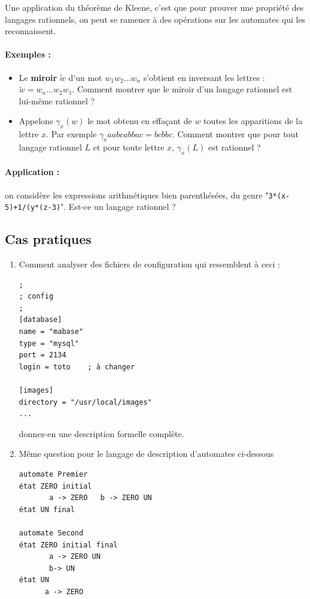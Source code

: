 \documentclass[10pt,twoside]{article}
\begin{document}
 Une application du théorème de Kleene, c'est que pour prouver
 une propriété des langages rationnels, on peut se ramener
 à des opérations sur les automates qui les reconnaissent.
 
\paragraph{ Exemples :}
 \begin{itemize}
 \item Le \textbf{miroir} $\widetilde{w}$ d'un mot $w_1 w_2 \ldots 
  w_n$ s'obtient 
 en inversant les lettres : $\widetilde{w} = w_n \ldots w_2 w_1$.
 Comment montrer que le miroir d'un langage 
 rationnel est lui-même rationnel ?
 \item Appelons $\gamma_x(w)$ le mot obtenu en effaçant de $w$ toutes
 les apparitions de la lettre $x$. 
 Par exemple $\gamma_a{aabcabbac} = bcbbc$. Comment montrer que 
 pour tout langage rationnel $L$ et pour toute lettre $x$, 
 $\gamma_x(L)$ est rationnel ?
 \end{itemize}
 
 \paragraph{Application :} on considère les expressions arithmétiques
 bien parenthésées, du genre "\texttt{3*(x-5)+1/(y*(z-3)}". 
 Est-ce un langage rationnel ?
 
\subsection{Cas pratiques}

\begin{enumerate}
\item 
Comment analyser des fichiers de configuration qui ressemblent à ceci :
\begin{verbatim}
;
; config
;
[database]
name = "mabase"
type = "mysql"
port = 2134
login = toto    ; à changer

[images]
directory = "/usr/local/images"
...
\end{verbatim}
donnez-en une description formelle complète.
\item 
Même question pour le langage de description d'automates ci-dessous
\begin{verbatim}
automate Premier
état ZERO initial
       a -> ZERO   b -> ZERO UN
état UN final

automate Second
état ZERO initial final  
       a -> ZERO UN
       b-> UN 
état UN  
      a -> ZERO
\end{verbatim}
\end{enumerate}
\end{document}
